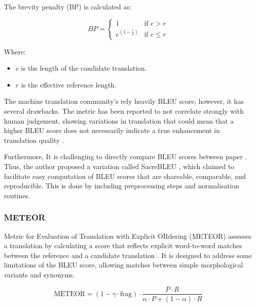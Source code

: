 \documentclass[a4paper]{article}
\begin{document}
The brevity penalty (BP) is calculated as:

\begin{equation}
    BP = \begin{cases}
        1                     & \text{if } c > r    \\
        e^{(1 - \frac{r}{c})} & \text{if } c \leq r
    \end{cases}
\end{equation}

Where:
\begin{itemize}
    \item \( c \) is the length of the candidate translation.
    \item \( r \) is the effective reference length.
\end{itemize}

The machine translation community's rely heavily BLEU score, however, it has several drawbacks. The metric has been reported to not correlate strongly with human judgement, showing variations in translation that could mean that a higher BLEU score does not necessarily indicate a true enhancement in translation quality \cite{callison-burch-2006-reevaluating-bleu}.

Furthermore, It is challenging to directly compare BLEU scores between paper \cite{post-2018-clarity-bleu}. Thus, the author proposed a variation called SacreBLEU \cite{post-2018-clarity-bleu}, which claimed to facilitate easy computation of BLEU scores that are shareable, comparable, and reproducible. This is done by including preprocessing steps and normalisation routines.


\subsubsection{METEOR}

Metric for Evaluation of Translation with Explicit ORdering (METEOR) \cite{lavie-2007-meteor} assesses a translation by calculating a score that reflects explicit word-to-word matches between the reference and a candidate translation \cite{agarwal-2008-meteor-mbleu-mter}. It is designed to address some limitations of the BLEU score, allowing matches between simple morphological variants and synonyms.

\begin{equation}
    \text{METEOR} = (1 - \gamma \cdot \text{frag}) \cdot \frac{P \cdot R}{\alpha \cdot P + (1 - \alpha) \cdot R}
\end{equation}
\end{document}
